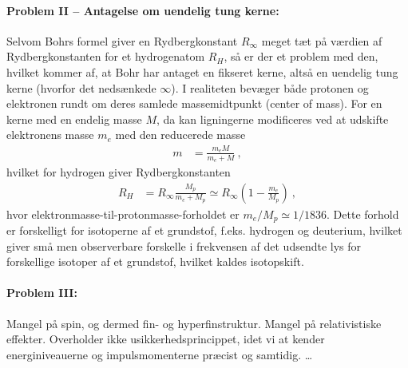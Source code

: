 \paragraph{Problem II -- Antagelse om uendelig tung kerne:} Selvom Bohrs formel giver en Rydbergkonstant $R_\infty$ meget tæt på værdien af Rydbergkonstanten for et hydrogenatom $R_H$, så er der et problem med den, hvilket kommer af, at Bohr har antaget en fikseret kerne, altså en uendelig tung kerne (hvorfor det nedsænkede $\infty$). I realiteten bevæger både protonen og elektronen rundt om deres samlede massemidtpunkt (center of mass). For en kerne med en endelig masse $M$, da kan ligningerne modificeres ved at udskifte elektronens masse $m_e$ med den reducerede masse
\begin{align}
    m &= \frac{m_e M}{m_e + M} \: ,
\end{align}
hvilket for hydrogen giver Rydbergkonstanten
\begin{align}
    R_H &= R_\infty \frac{M_p}{m_e + M_p} \simeq R_\infty \left(1 - \frac{m_e}{M_p}\right) \: ,
\end{align}
hvor elektronmasse-til-protonmasse-forholdet er $m_e/M_p \simeq 1/1836$. Dette forhold er forskelligt for isotoperne af et grundstof, f.eks. hydrogen og deuterium, hvilket giver små men observerbare forskelle i frekvensen af det udsendte lys for forskellige isotoper af et grundstof, hvilket kaldes isotopskift.


\paragraph{Problem III:} Mangel på spin, og dermed fin- og hyperfinstruktur. Mangel på relativistiske effekter. Overholder ikke usikkerhedsprincippet, idet vi at kender energiniveauerne og impulsmomenterne præcist og samtidig. \ldots